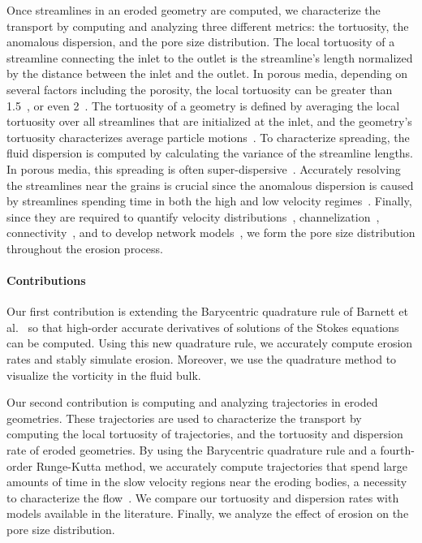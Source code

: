 \documentclass[preprint,10pt]{elsarticle}
\begin{document}
Once streamlines in an eroded geometry are computed, we characterize the
transport by computing and analyzing three different metrics: the
tortuosity, the anomalous dispersion, and the pore size distribution.
The local tortuosity of a streamline connecting the inlet to the outlet
is the streamline's length normalized by the distance between the inlet
and the outlet.  In porous media, depending on several factors including
the porosity, the local tortuosity can be greater than
1.5~\cite{kop-kat-tim1996, mat-kha-koz2008}, or even
2~\cite{dud-koz-mat2011}.  The tortuosity of a geometry is defined by
averaging the local tortuosity over all streamlines that are initialized
at the inlet, and the geometry's tortuosity characterizes average
particle motions~\cite{hak-com-den2019}.  To characterize spreading, the
fluid dispersion is computed by calculating the variance of the
streamline lengths. In porous media, this spreading is often
super-dispersive~\cite{kan-dea-nun-bij-blu-jua2014, cus-hu-den1995,
dea-leb-den-tar-bol-dav2013}. Accurately resolving the streamlines near
the grains is crucial since the anomalous dispersion is caused by
streamlines spending time in both the high and low velocity
regimes~\cite{ber-sch2001}.  Finally, since they are required to
quantify velocity distributions~\cite{ali-par-wei-bre2017,
dea-qua-bir-jua2018}, channelization~\cite{sie-ili-pri-riv-gua2019},
connectivity~\cite{knu-car2005, wes-blo-gra2001}, and to develop network
models~\cite{bry-kin-mel1993, bry-mel-cad1993, bij-blu2006}, we form the
pore size distribution throughout the erosion process.

\paragraph{Contributions}
Our first contribution is extending the Barycentric quadrature rule of
Barnett et al.~\cite{bar-wu-vee2015} so that high-order accurate
derivatives of solutions of the Stokes equations can be computed.  Using
this new quadrature rule, we accurately compute erosion rates and stably
simulate erosion.  Moreover, we use the quadrature method to visualize
the vorticity in the fluid bulk.

Our second contribution is computing and analyzing trajectories in
eroded geometries.  These trajectories are used to characterize the
transport by computing the local tortuosity of trajectories, and the
tortuosity and dispersion rate of eroded geometries. By using the
Barycentric quadrature rule and a fourth-order Runge-Kutta method, we
accurately compute trajectories that spend large amounts of time in the
slow velocity regions near the eroding bodies, a necessity to
characterize the flow~\cite{dea-leb-den-tar-bol-dav2013}.  We compare
our tortuosity and dispersion rates with models available in the
literature.  Finally, we analyze the effect of erosion on the pore size
distribution.
\end{document}
